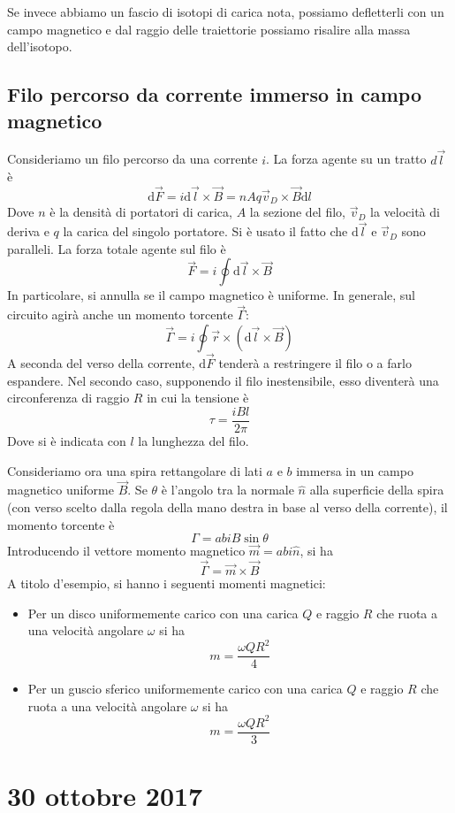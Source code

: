 \documentclass[a4paper,11pt]{book}
\newcommand{\dif}{\mathrm{d}}
\theoremstyle{definition}
\theoremstyle{theorem}
\begin{document}
Se invece abbiamo un fascio di isotopi di carica nota, possiamo defletterli con un campo magnetico e dal raggio delle traiettorie possiamo risalire alla massa dell'isotopo.
\subsection{Filo percorso da corrente immerso in campo magnetico}
Consideriamo un filo percorso da una corrente $i$. La forza agente su un tratto $d\vec{l}$ è
\[\dif\vec{F}=i\dif\vec{l}\times\vec{B}=nAq\vec{v}_D\times\vec{B}\dif l\]
Dove $n$ è la densità di portatori di carica, $A$ la sezione del filo, $\vec{v}_D$ la velocità di deriva e $q$ la carica del singolo portatore. Si è usato il fatto che $\dif\vec{l}$ e $\vec{v}_D$ sono paralleli. La forza totale agente sul filo è
\[\vec{F}=i\oint\dif\vec{l}\times\vec{B}\]
In particolare, si annulla se il campo magnetico è uniforme. In generale, sul circuito agirà anche un momento torcente $\vec{\Gamma}$:
\[\vec{\Gamma}=i\oint\vec{r}\times\left(\dif\vec{l}\times\vec{B}\right)\]
A seconda del verso della corrente, $\dif\vec{F}$ tenderà a restringere il filo o a farlo espandere. Nel secondo caso, supponendo il filo inestensibile, esso diventerà una circonferenza di raggio $R$ in cui la tensione è
\[\tau=\frac{iBl}{2\pi}\]
Dove si è indicata con $l$ la lunghezza del filo.

Consideriamo ora una spira rettangolare di lati $a$ e $b$ immersa in un campo magnetico uniforme $\vec{B}$. Se $\theta$ è l'angolo tra la normale $\hat{n}$ alla superficie della spira (con verso scelto dalla regola della mano destra in base al verso della corrente), il momento torcente è
\[\Gamma=abiB\sin\theta\]
Introducendo il vettore momento magnetico $\vec{m}=abi\hat{n}$, si ha
\[\vec{\Gamma}=\vec{m}\times\vec{B}\]
A titolo d'esempio, si hanno i seguenti momenti magnetici:
\begin{itemize}
	\item Per un disco uniformemente carico con una carica $Q$ e raggio $R$ che ruota a una velocità angolare $\omega$ si ha
	\[m=\frac{\omega QR^2}{4}\]
	\item Per un guscio sferico uniformemente carico con una carica $Q$ e raggio $R$ che ruota a una velocità angolare $\omega$ si ha
	\[m=\frac{\omega QR^2}{3}\]
\end{itemize}
\section{30 ottobre 2017}
\end{document}
